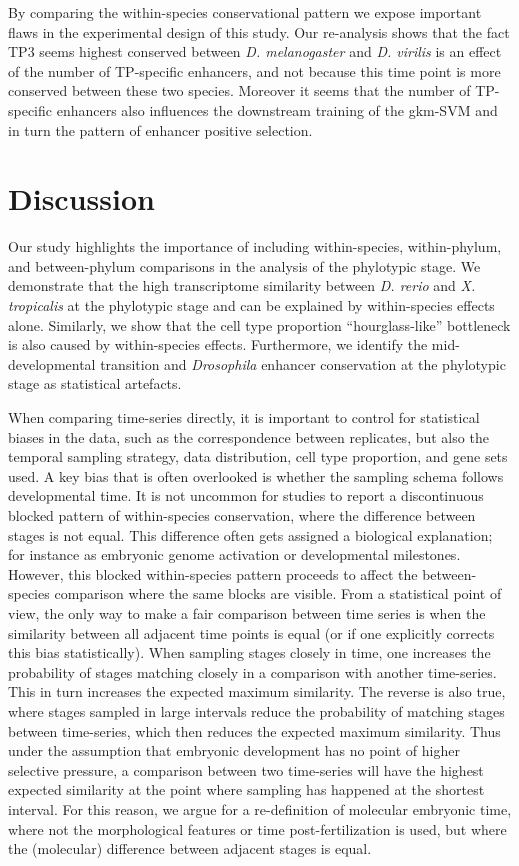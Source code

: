 By comparing the within-species conservational pattern we expose important flaws in the experimental design of this study. Our re-analysis shows that the fact TP3 seems highest conserved between \textit{D. melanogaster} and \textit{D. virilis} is an effect of the number of TP-specific enhancers, and not because this time point is more conserved between these two species. Moreover it seems that the number of TP-specific enhancers also influences the downstream training of the gkm-SVM and in turn the pattern of enhancer positive selection. 

\section{Discussion}

Our study highlights the importance of including within-species, within-phylum, and between-phylum comparisons in the analysis of the phylotypic stage. We demonstrate that the high transcriptome similarity between \textit{D. rerio} and \textit{X. tropicalis} at the phylotypic stage and can be explained by within-species effects alone. Similarly, we show that the cell type proportion ``hourglass-like'' bottleneck is also caused by within-species effects. Furthermore, we identify the mid-developmental transition and \textit{Drosophila} enhancer conservation at the phylotypic stage as statistical artefacts. 

When comparing time-series directly, it is important to control for statistical biases in the data, such as the correspondence between replicates, but also the temporal sampling strategy, data distribution, cell type proportion, and gene sets used. A key bias that is often overlooked is whether the sampling schema follows developmental time\cite{BinindaEmonds2002}. It is not uncommon for studies to report a discontinuous blocked pattern of within-species conservation, where the difference between stages is not equal. This difference often gets assigned a biological explanation; for instance as embryonic genome activation\cite{Yanai2011} or developmental milestones\cite{Levin2012}. However, this blocked within-species pattern proceeds to affect the between-species comparison where the same blocks are visible. From a statistical point of view, the only way to make a fair comparison between time series is when the similarity between all adjacent time points is equal (or if one explicitly corrects this bias statistically). When sampling stages closely in time, one increases the probability of stages matching closely in a comparison with another time-series. This in turn increases the expected maximum similarity. The reverse is also true, where stages sampled in large intervals reduce the probability of matching stages between time-series, which then reduces the expected maximum similarity. Thus under the assumption that embryonic development has no point of higher selective pressure, a comparison between two time-series will have the highest expected similarity at the point where sampling has happened at the shortest interval. For this reason, we argue for a re-definition of molecular embryonic time, where not the morphological features or time post-fertilization is used, but where the (molecular) difference between adjacent stages is equal.

